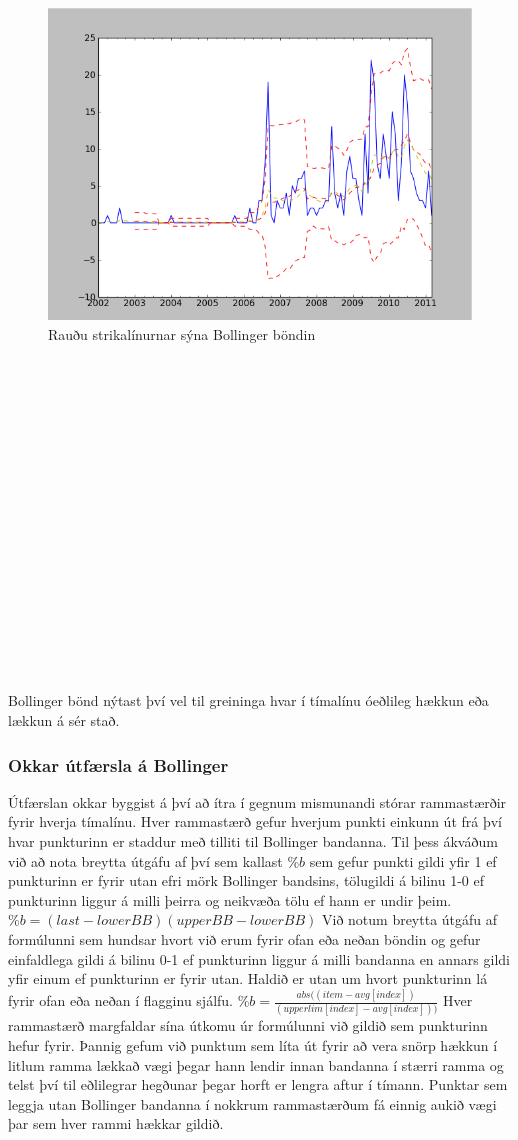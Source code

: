 \documentclass[11pt]{article}
\begin{document}
\begin{figure}
 \begin{center}
 \includegraphics[width=.45\textwidth]{Bollinger.png}
 \caption{Rauðu strikalínurnar sýna Bollinger böndin}
  \end{center}
\end{figure}
\hfill
\\\\\\\\\\\\\\\\\\\\\\\\\\\\\\\\\\
Bollinger bönd nýtast því vel til greininga hvar í tímalínu óeðlileg hækkun eða lækkun á sér stað.
\\
\subsubsection{Okkar útfærsla á Bollinger}
Útfærslan okkar byggist á því að ítra í gegnum mismunandi stórar rammastærðir fyrir hverja tímalínu.
Hver rammastærð gefur hverjum punkti einkunn út frá því hvar punkturinn er staddur með tilliti til Bollinger bandanna.
Til þess ákváðum við að nota breytta útgáfu af því sem kallast $\%b$ sem gefur punkti gildi yfir 1 ef punkturinn er fyrir utan 
efri mörk Bollinger bandsins, tölugildi á bilinu 1-0 ef punkturinn liggur á milli þeirra og neikvæða tölu ef hann er undir þeim.
$\%b={(last-lowerBB)}{(upperBB-lowerBB)}$
Við notum breytta útgáfu af formúlunni sem hundsar hvort við erum fyrir ofan eða neðan böndin og gefur einfaldlega gildi á bilinu
0-1 ef punkturinn liggur á milli bandanna en annars gildi yfir einum ef punkturinn er fyrir utan. Haldið er utan um hvort punkturinn 
lá fyrir ofan eða neðan í flagginu sjálfu.
$\%b=\frac{abs((item - avg[index])}{(upperlim[index] - avg[index]))}$
Hver rammastærð margfaldar sína útkomu úr formúlunni við gildið sem punkturinn hefur fyrir.
Þannig gefum við punktum sem líta út fyrir að vera snörp hækkun í litlum ramma lækkað vægi þegar hann lendir innan bandanna í stærri ramma
og telst því til eðlilegrar hegðunar þegar horft er lengra aftur í tímann.
Punktar sem leggja utan Bollinger bandanna í nokkrum rammastærðum fá einnig aukið vægi þar sem hver rammi hækkar gildið.
\end{document}
